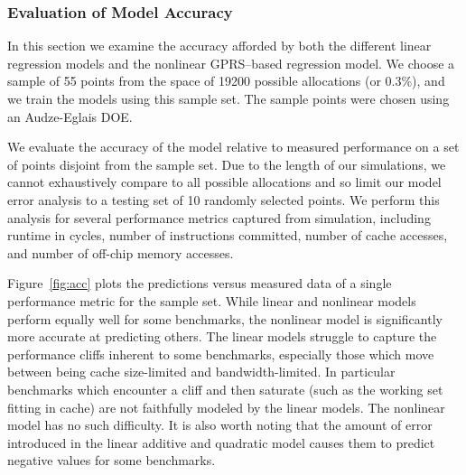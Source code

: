 \subsubsection*{Evaluation of Model Accuracy}
In this section we examine the accuracy afforded by both the different linear regression models and the nonlinear GPRS--based regression model.  We choose a sample of 55 points from the space of 19200 possible allocations (or 0.3\%), and we train the models using this sample set.  The sample points were chosen using an Audze-Eglais DOE. 

We evaluate the accuracy of the model relative to measured performance on a set of points disjoint from the sample set.  Due to the length of our simulations, we cannot exhaustively compare to all possible allocations and so limit our model error analysis to a testing set of 10 randomly selected points.  We perform this analysis for several performance metrics captured from simulation, including runtime in cycles, number of instructions committed, number of cache accesses, and number of off-chip memory accesses.  

 Figure~\ref{fig:acc} plots the predictions versus measured data of a single performance metric for the sample set. While linear and nonlinear models perform equally well for some benchmarks, the nonlinear model is significantly more accurate at predicting others. The linear models struggle to capture the performance cliffs inherent to some benchmarks, especially those which move between being cache size-limited and bandwidth-limited.  In particular benchmarks which encounter a cliff and then saturate (such as the working set fitting in cache) are not faithfully modeled by the linear models.  The nonlinear model has no such difficulty.  It is also worth noting that the amount of error introduced in the linear additive and quadratic model causes them to predict negative values for some benchmarks.

